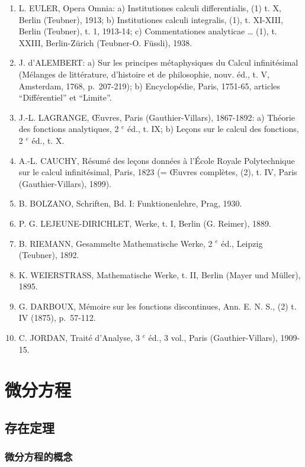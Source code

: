 \begin{enumerate}
\def\labelenumi{(\Roman{enumi})}
\setcounter{enumi}{24}
\item
  L. EULER, Opera Omnia: a) Institutiones calculi differentialis, (1) t. X, Berlin (Teubner), 1913; b) Institutiones calculi integralis, (1), t. XI-XIII, Berlin (Teubner), t. 1, 1913-14; c) Commentationes analyticae \ldots{} (1), t. XXIII, Berlin-Zürich (Teubner-O. Füssli), 1938.
\item
  J. d'ALEMBERT: a) Sur les principes métaphysiques du Calcul infinitésimal (Mélanges de littérature, d'histoire et de philosophie, nouv. éd., t. V, Amsterdam, 1768, p.~207-219); b) Encyclopédie, Paris, 1751-65, articles ``Différentiel'' et ``Limite''.
\item
  J.-L. LAGRANGE, Œuvres, Paris (Gauthier-Villars), 1867-1892: a) Théorie des fonctions analytiques, 2 \(^{e}\) éd., t. IX; b) Leçons sur le calcul des fonctions, 2 \(^{e}\) éd., t. X.
\item
  A.-L. CAUCHY, Résumé des leçons données à l'École Royale Polytechnique sur le calcul infinitésimal, Paris, 1823 (= Œuvres complètes, (2), t. IV, Paris (Gauthier-Villars), 1899).
\item
  B. BOLZANO, Schriften, Bd. I: Funktionenlehre, Prag, 1930.
\item
  P. G. LEJEUNE-DIRICHLET, Werke, t. I, Berlin (G. Reimer), 1889.
\item
  B. RIEMANN, Gesammelte Mathematische Werke, 2 \(^{e}\) éd., Leipzig (Teubner), 1892.
\item
  K. WEIERSTRASS, Mathematische Werke, t. II, Berlin (Mayer und Müller), 1895.
\item
  G. DARBOUX, Mémoire sur les fonctions discontinues, Ann. E. N. S., (2) t. IV (1875), p.~57-112.
\item
  C. JORDAN, Traité d'Analyse, 3 \(^{e}\) éd., 3 vol., Paris (Gauthier-Villars), 1909-15.
\end{enumerate}

\chapter{微分方程}

\section{存在定理}

\subsection{微分方程的概念}

